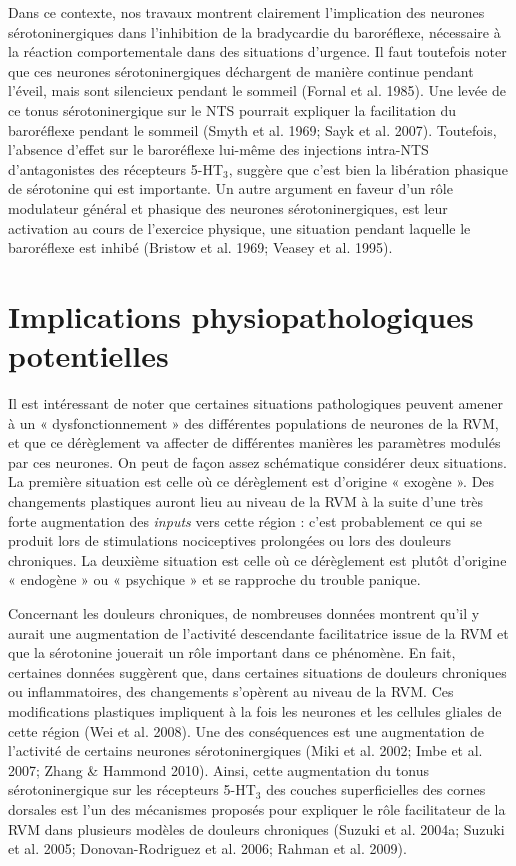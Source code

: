 \documentclass[a4paper,12pt,twoside]{report}
\begin{document}
Dans ce contexte, nos travaux montrent clairement l’implication des neurones sérotoninergiques dans l’inhibition de la bradycardie du baroréflexe, nécessaire à la réaction comportementale dans des situations d’urgence. Il faut toutefois noter que ces neurones sérotoninergiques déchargent de manière continue pendant l’éveil, mais sont silencieux pendant le sommeil (Fornal et al. 1985). Une levée de ce tonus sérotoninergique sur le NTS pourrait expliquer la facilitation du baroréflexe pendant le sommeil (Smyth et al. 1969; Sayk et al. 2007). Toutefois, l’absence d’effet sur le baroréflexe lui-même des injections intra-NTS d’antagonistes des récepteurs 5-HT$_{3}$, suggère que c’est bien la libération phasique de sérotonine qui est importante. Un autre argument en faveur d’un rôle modulateur général et phasique des neurones sérotoninergiques, est leur activation au cours de l’exercice physique, une situation pendant laquelle le baroréflexe est inhibé (Bristow et al. 1969; Veasey et al. 1995).

\section{Implications physiopathologiques potentielles}

Il est intéressant de noter que certaines situations pathologiques peuvent amener à un « dysfonctionnement » des différentes populations de neurones de la RVM, et que ce dérèglement va affecter de différentes manières les paramètres modulés par ces neurones. On peut de façon assez schématique considérer deux situations. La première situation est celle où ce dérèglement est d’origine « exogène ». Des changements plastiques auront lieu au niveau de la RVM à la suite d’une très forte augmentation des \textit{inputs} vers cette région : c’est probablement ce qui se produit lors de stimulations nociceptives prolongées ou lors des douleurs chroniques. La deuxième situation est celle où ce dérèglement est plutôt d’origine « endogène » ou « psychique » et se rapproche du trouble panique.

\bigskip 

Concernant les douleurs chroniques, de nombreuses données montrent qu’il y aurait une augmentation de l’activité descendante facilitatrice issue de la RVM et que la sérotonine jouerait un rôle important dans ce phénomène. En fait, certaines données suggèrent que, dans certaines situations de douleurs chroniques ou inflammatoires, des changements s’opèrent au niveau de la RVM. Ces modifications plastiques impliquent à la fois les neurones et les cellules gliales de cette région (Wei et al. 2008). Une des conséquences est une augmentation de l’activité de certains neurones sérotoninergiques (Miki et al. 2002; Imbe et al. 2007; Zhang \& Hammond 2010). Ainsi, cette augmentation du tonus sérotoninergique sur les récepteurs 5-HT$_{3}$ des couches superficielles des cornes dorsales est l’un des mécanismes proposés pour expliquer le rôle facilitateur de la RVM dans plusieurs modèles de douleurs chroniques (Suzuki et al. 2004a; Suzuki et al. 2005; Donovan-Rodriguez et al. 2006; Rahman et al. 2009).
\end{document}
